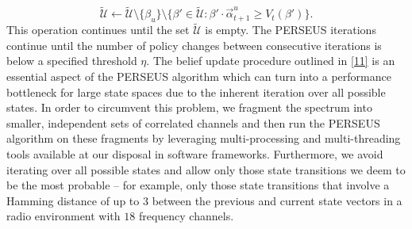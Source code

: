 \documentclass[10pt,twocolumn]{IEEEtran}
\begin{document}
$$
\tilde{\mathcal{U}}\leftarrow \tilde{\mathcal{U}}\setminus\{\beta_u\}\setminus
\{\beta'\in\tilde{\mathcal{U}}:\beta'{\cdot}\vec{\alpha}_{t+1}^{u}\geq V_t(\beta')\}.
$$
This operation continues until the set $\tilde{\mathcal{U}}$ is empty. The PERSEUS iterations continue until the number of policy changes between consecutive iterations is below a specified threshold $\eta$. The belief update procedure outlined in \eqref{11} is an essential aspect of the PERSEUS algorithm which can turn into a performance bottleneck for large state spaces due to the inherent iteration over all possible states. In order to circumvent this problem, we fragment the spectrum into smaller, independent sets of correlated channels and then run the PERSEUS algorithm on these fragments by leveraging multi-processing and multi-threading tools available at our disposal in software frameworks. Furthermore, we avoid iterating over all possible states and allow only those state transitions we deem to be the most probable -- for example, only those state transitions that involve a Hamming distance of up to $3$ between the previous and current state vectors in a radio environment with $18$ frequency channels.
\vspace{-3.5mm}
\end{document}
